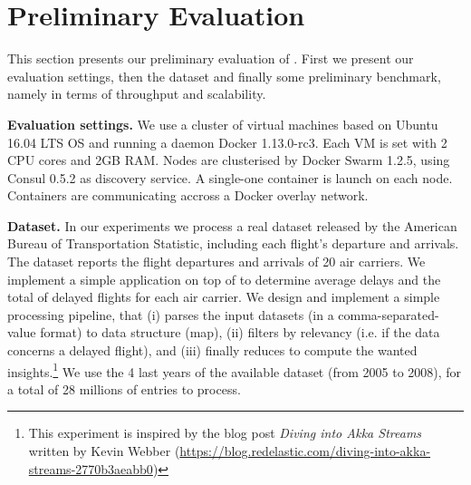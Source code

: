 \section{Preliminary Evaluation}
\label{sec:eval}

This section presents our preliminary evaluation of \SYS.
First we present our evaluation settings, then the dataset and finally some preliminary benchmark, namely in terms of throughput and scalability.

\textbf{Evaluation settings.} We use a cluster of virtual machines based on Ubuntu 16.04 LTS OS and running a daemon Docker 1.13.0-rc3.
Each VM is set with 2 CPU cores and 2GB RAM.
Nodes are clusterised by Docker Swarm 1.2.5, using Consul 0.5.2 as discovery service.
A single-one container is launch on each node.
Containers are communicating accross a Docker overlay network.

\textbf{Dataset.} In our experiments we process a real dataset released by the American Bureau of Transportation Statistic\cite{rita:bts}, including each flight's departure and arrivals\cite{statistical_computing:data}.
The dataset reports the flight departures and arrivals of 20 air carriers.
We implement a simple application on top of \SYS to determine average delays and the total of delayed flights for each air carrier.
We design and implement a simple processing pipeline, that (i) parses the input datasets (in a comma-separated-value format) to data structure (map), (ii) filters by relevancy (i.e. if the data concerns a delayed flight), and (iii) finally reduces to compute the wanted insights.\footnote{This experiment is inspired by the blog post \emph{Diving into Akka Streams} written by Kevin Webber (\url{https://blog.redelastic.com/diving-into-akka-streams-2770b3aeabb0})}
We use the 4 last years of the available dataset (from 2005 to 2008), for a total of 28 millions of entries to process.


